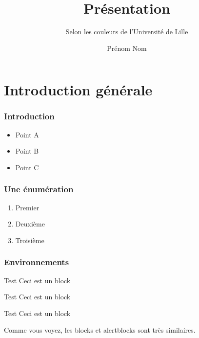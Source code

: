 \documentclass[svgnames,12pt,aspectratio=149]{beamer}
\author{Prénom Nom}
\title{Présentation}
\subtitle{Selon les couleurs de l'Université de Lille}
\begin{document}
\begin{frame}[plain]
  \titlepage
\end{frame}

\section{Introduction générale}
\begin{frame}
  \frametitle{Introduction}

  \begin{itemize}
  \item Point A
  \item Point B
  \item Point C
  \end{itemize}
\end{frame}

\begin{frame}
  \frametitle{Une énumération}

  \begin{enumerate}
  \item Premier
  \item Deuxième
  \item Troisième
  \end{enumerate}
\end{frame}

\begin{frame}
  \frametitle{Environnements}
  \begin{block}{Test}
    Ceci est un block
  \end{block}


  \begin{alertblock}{Test}
    Ceci est un block
  \end{alertblock}

  \begin{exampleblock}{Test}
    Ceci est un block
  \end{exampleblock}

  Comme vous voyez, les \alert{blocks} et \alert{alertblocks} sont très similaires.
  
\end{frame}
\end{document}
